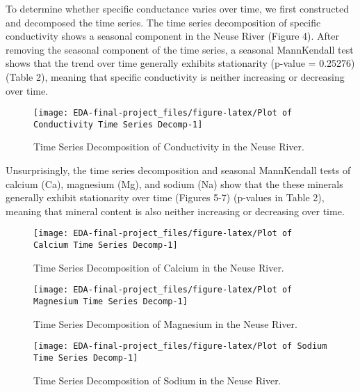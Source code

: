 \documentclass[
  12pt,
]{article}
\begin{document}
To determine whether specific conductance varies over time, we first
constructed and decomposed the time series. The time series
decomposition of specific conductivity shows a seasonal component in the
Neuse River (Figure 4). After removing the seasonal component of the
time series, a seasonal MannKendall test shows that the trend over time
generally exhibits stationarity (p-value = 0.25276) (Table 2), meaning
that specific conductivity is neither increasing or decreasing over
time.

\begin{figure}

{\centering \texttt{[image: EDA-final-project\_files/figure-latex/Plot of Conductivity Time Series Decomp-1]} 

}

\caption{Time Series Decomposition of Conductivity in the Neuse River.}\label{fig:Plot of Conductivity Time Series Decomp}
\end{figure}

\newpage

Unsurprisingly, the time series decomposition and seasonal MannKendall
tests of calcium (Ca), magnesium (Mg), and sodium (Na) show that the
these minerals generally exhibit stationarity over time (Figures 5-7)
(p-values in Table 2), meaning that mineral content is also neither
increasing or decreasing over time.

\begin{figure}

{\centering \texttt{[image: EDA-final-project\_files/figure-latex/Plot of Calcium Time Series Decomp-1]} 

}

\caption{Time Series Decomposition of Calcium in the Neuse River.}\label{fig:Plot of Calcium Time Series Decomp}
\end{figure}

\begin{figure}

{\centering \texttt{[image: EDA-final-project\_files/figure-latex/Plot of Magnesium Time Series Decomp-1]} 

}

\caption{Time Series Decomposition of Magnesium in the Neuse River.}\label{fig:Plot of Magnesium Time Series Decomp}
\end{figure}

\begin{figure}

{\centering \texttt{[image: EDA-final-project\_files/figure-latex/Plot of Sodium Time Series Decomp-1]} 

}

\caption{Time Series Decomposition of Sodium in the Neuse River.}\label{fig:Plot of Sodium Time Series Decomp}
\end{figure}
\end{document}
